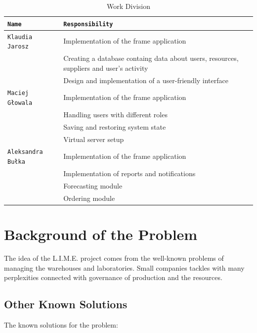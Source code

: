 \documentclass[a4paper,11pt,twoside]{report}
\theoremstyle{definition}
\begin{document}
\begin{table}[!h]%
\caption[Work Division]{Work Division}
\label{division}
\centering
\begin{tabular}{|p{4cm}|p{12cm}|}
\hline
\texttt{Name} & \texttt{Responsibility} \\ \hline
\texttt{Klaudia Jarosz} & Implementation of the frame application\\ \cline{2-2}
\texttt{} & Creating a database containg data about users, resources, suppliers and user's activity\\  \cline{2-2}
\texttt{} & Design and implementation of a user-friendly interface \\ \hline
\texttt{Maciej Głowala} & Implementation of the frame application\\ \cline{2-2}
\texttt{} & Handling users with different roles\\  \cline{2-2}
\texttt{} & Saving and restoring system state \\ \cline{2-2}
\texttt{} & Virtual server setup \\ \hline
\texttt{Aleksandra Bułka} & Implementation of the frame application\\ \cline{2-2}
\texttt{} & Implementation of reports and notifications\\  \cline{2-2}
\texttt{} & Forecasting module\\ \cline{2-2}
\texttt{} & Ordering module \\ \hline


\end{tabular}
\end{table}




\chapter{Background of the Problem}

The idea of the L.I.M.E. project comes from the well-known problems of managing the warehouses and laboratories. Small companies tackles with many perplexities connected with governance of production and the resources.

\section{Other Known Solutions}

The known solutions for the problem:
\end{document}
